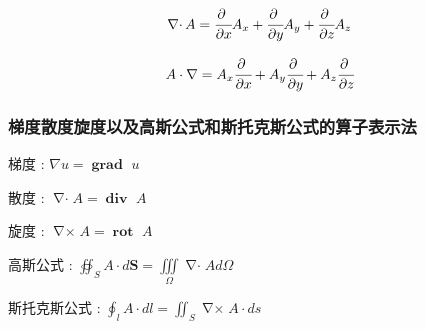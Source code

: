 \documentclass[UTF8,12pt]{ctexbook}
\newcommand{\partialDerivativeFrac}[2]{\cfrac{\partial #1}{\partial #2}}
\newcommand{\tripleIntegralOnZone}[1]{\iiint\limits_{#1}}
\newcommand{\curveIntegralOnLine}[1]{\oint_{#1}}
\newcommand{\doubleCurveIntegralOnZone}[1]{\oiint_{#1}}
\newcommand{\surfaceIntegralOnSurface}[1]{\iint_{#1}}
\DeclareMathOperator{\divergenceText}{\mathbf{div}\ }
\DeclareMathOperator{\divergenceSymbol}{\nabla\cdot}
\DeclareMathOperator{\curlSymbol}{\nabla\times}
\DeclareMathOperator{\curlRotText}{\mathbf{rot}\ }
\DeclareMathOperator{\gradText}{\mathbf{grad}\ }
\begin{document}
{{{{{\begin{itemize}
{              $$
                \divergenceSymbol A = \partialDerivativeFrac{\ }{x}A_x + \partialDerivativeFrac{\ }{y}A_y + \partialDerivativeFrac{\ }{z}A_z
              $$

              $$
                A \cdot \nabla = A_x\partialDerivativeFrac{\ }{x} + A_y\partialDerivativeFrac{\ }{y} + A_z\partialDerivativeFrac{\ }{z}
              $$
              }
      \end{itemize}
    }%

    \subsubsection{梯度散度旋度以及高斯公式和斯托克斯公式的算子表示法}{
      梯度 : $\nabla u = \gradText u$

      散度 : $\divergenceSymbol A = \divergenceText A$

      旋度 : $\curlSymbol A = \curlRotText A$

      高斯公式 : $\doubleCurveIntegralOnZone{S} A \cdot d\mathbf{S} = \tripleIntegralOnZone{\Omega} \divergenceSymbol A d\Omega$

      斯托克斯公式 : $\curveIntegralOnLine{l} A \cdot dl = \surfaceIntegralOnSurface{S}\curlSymbol A \cdot ds$
    }%

}}}}
\end{document}
